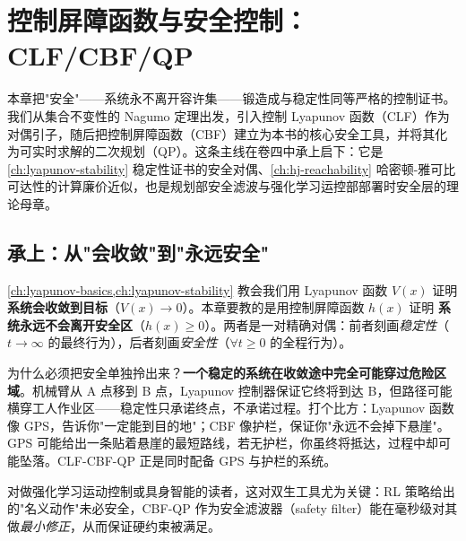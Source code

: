 \chapter{控制屏障函数与安全控制：CLF/CBF/QP}
\label{ch:clf-cbf}


\noindent
本章把"安全"——系统永不离开容许集——锻造成与稳定性同等严格的控制证书。我们从集合不变性的 Nagumo 定理出发，引入控制 Lyapunov 函数（CLF）作为对偶引子，随后把控制屏障函数（CBF）建立为本书的核心安全工具，并将其化为可实时求解的二次规划（QP）。这条主线在卷四中承上启下：它是 \cref{ch:lyapunov-stability} 稳定性证书的安全对偶、\cref{ch:hj-reachability} 哈密顿-雅可比可达性的计算廉价近似，也是规划部安全滤波与强化学习运控部部署时安全层的理论母章。
\medskip

\section*{承上：从"会收敛"到"永远安全"}

\cref{ch:lyapunov-basics,ch:lyapunov-stability} 教会我们用 Lyapunov 函数 $V(x)$ 证明 \textbf{系统会收敛到目标}（$V(x)\to0$）。本章要教的是用控制屏障函数 $h(x)$ 证明 \textbf{系统永远不会离开安全区}（$h(x)\ge0$）。两者是一对精确对偶：前者刻画\emph{稳定性}（$t\to\infty$ 的最终行为），后者刻画\emph{安全性}（$\forall t\ge0$ 的全程行为）。

为什么必须把安全单独拎出来？\textbf{一个稳定的系统在收敛途中完全可能穿过危险区域}。机械臂从 A 点移到 B 点，Lyapunov 控制器保证它终将到达 B，但路径可能横穿工人作业区——稳定性只承诺终点，不承诺过程。打个比方：Lyapunov 函数像 GPS，告诉你"一定能到目的地"；CBF 像护栏，保证你"永远不会掉下悬崖"。GPS 可能给出一条贴着悬崖的最短路线，若无护栏，你虽终将抵达，过程中却可能坠落。CLF-CBF-QP 正是同时配备 GPS 与护栏的系统。

对做强化学习运动控制或具身智能的读者，这对双生工具尤为关键：RL 策略给出的"名义动作"未必安全，CBF-QP 作为安全滤波器（safety filter）能在毫秒级对其做\emph{最小修正}，从而保证硬约束被满足。


